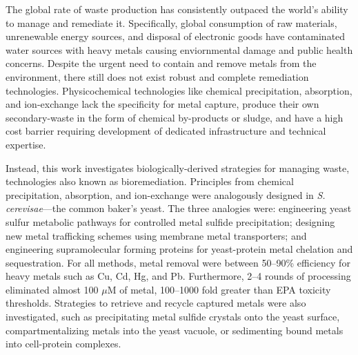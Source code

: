 \begin{abstractpage}

The global rate of waste production has consistently outpaced the world's ability to manage and remediate it. Specifically, global consumption of raw materials, unrenewable energy sources, and disposal of electronic goods have contaminated water sources with heavy metals causing enviornmental damage and public health concerns.
Despite the urgent need to contain and remove metals from the environment, there still does not exist robust and complete remediation technologies. Physicochemical technologies like chemical precipitation, absorption, and ion-exchange lack the specificity for metal capture, produce their own secondary-waste in the form of chemical by-products or sludge, and have a high cost barrier requiring development of dedicated infrastructure and technical expertise.

Instead, this work investigates biologically-derived strategies for managing waste, technologies also known as bioremediation. Principles from chemical precipitation, absorption, and ion-exchange were analogously designed in \textit{S. cerevisae}---the common baker's yeast. The three analogies were: engineering yeast sulfur metabolic pathways for controlled metal sulfide precipitation; designing new metal trafficking schemes using membrane metal transporters; and engineering supramolecular forming proteins for yeast-protein metal chelation and sequestration. For all methods, metal removal were between 50--90\% efficiency for heavy metals such as Cu, Cd, Hg, and Pb. Furthermore, 2--4 rounds of processing eliminated almost 100 $\mu$M of metal, 100--1000 fold greater than EPA toxicity thresholds. Strategies to retrieve and recycle captured metals were also investigated, such as precipitating metal sulfide crystals onto the yeast surface, compartmentalizing metals into the yeast vacuole, or sedimenting bound metals into cell-protein complexes.


\end{abstractpage}
